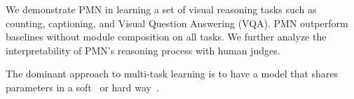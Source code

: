\documentclass{article}
\makeatletter
\newcommand{\MT}[1]{{\color{RoyalPurple}{[@Makarand: #1]}}}
\DeclareRobustCommand\onedot{\futurelet\@let@token\@onedot}
\def\@onedot{\ifx\@let@token.\else.\null\fi\xspace}
\def\ie{\emph{i.e}\onedot} \def\Ie{\emph{I.e}\onedot}
\makeatother
\begin{document}
We demonstrate PMN in learning a set of visual reasoning tasks such as counting, captioning, and Visual Question Answering (VQA).
PMN outperform baselines without module composition on all tasks.
We further analyze the interpretability of PMN's reasoning process with human judges.

The dominant approach to multi-task learning is to have a model that shares parameters in a soft~\citep{duong15softmtl,yang17softmtl} or hard way~\citep{caruana1993}.
\end{document}
